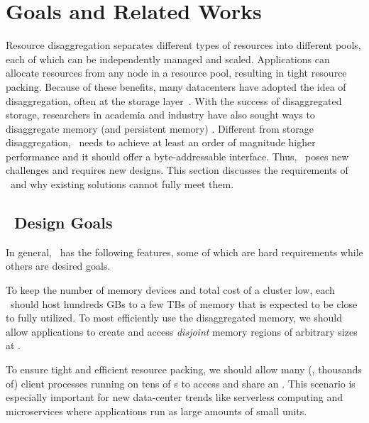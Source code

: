 \section{Goals and Related Works}
\label{sec:clio:motivation}

Resource disaggregation 
separates different types of resources into different pools,
each of which can be independently managed and scaled.
Applications can allocate resources from any node in a resource pool, resulting in tight resource packing. %
Because of these benefits, %
many datacenters have adopted the idea of disaggregation, often at the storage 
layer~\cite{FACEBOOK-BRYCECANYON,FB1,SnowFlake-NSDI20,AMAZON-S3,AMAZON-EBS,Pangu,FC-SAN-book}.
With the success of disaggregated storage,
researchers in academia and industry have also sought ways to disaggregate memory
(and persistent memory)
\cite{Lim09-disaggregate,FireBox-FASTKeynote,IntelRackScale,Lim12-HPCA,Shan18-OSDI,Shan17-SOCC,RAMCloud,Tsai20-ATC,AIFM,FastSwap,InfiniSwap,Semeru,Nitu18-EUROSYS}.
Different from storage disaggregation,
\md\ needs to achieve at least an order of magnitude higher performance and it should offer a byte-addressable interface.
Thus, \md\ poses new challenges and requires new designs.
This section discusses the requirements of \md\ and why existing solutions cannot fully meet them.

\subsection{\md\ Design Goals}
\label{sec:clio:requirements}
In general, \md\ has the following features, some of which are hard requirements while others are desired goals.

To keep the number of memory devices and total cost of a cluster low,
each \MN\ should host hundreds GBs to a few TBs of memory that is expected to be close to fully utilized.
To most efficiently use the disaggregated memory, we should allow applications to create and access {\em disjoint} memory regions of arbitrary sizes at \MN.

To ensure tight and efficient resource packing,
we should allow many (\eg, thousands of) client processes running on tens of \CN{}s to access and share an \MN.
This scenario is especially important for new data-center trends like serverless computing and microservices where applications run as large amounts of small units.

